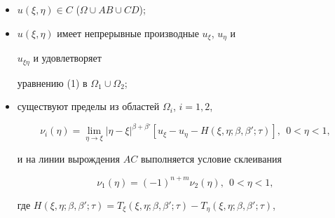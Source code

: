 \begin{itemize} 


\item[1)] $u(\xi,\eta)\in C$ ($\Omega\cup AB\cup CD$); 


\item[2)] $u(\xi,\eta)$ имеет непрерывные производные $u_\xi$, $u_\eta$ и 


$u_{\xi\eta}$ и удовлетворяет 


уравнению (1) в $\Omega_1\cup\Omega_2$; 


\item[3)] существуют пределы из областей $\Omega_i$, $i=1,2$, 


\begin{equation} 


\nu_i(\eta)=\lim_{\eta\to\xi}|\eta-\xi|^{\beta+\beta'} 


[u_\xi-u_\eta-H(\xi,\eta;\beta,\beta';\tau)],\ \ 0<\eta<1, 


\end{equation} 


и на линии вырождения $AC$ выполняется условие склеивания 


\begin{equation} 


\nu_1(\eta)=(-1)^{n+m}\nu_2(\eta),\ \ 0<\eta<1, 


\end{equation} 


где $H(\xi,\eta;\beta,\beta';\tau)= T_\xi(\xi,\eta;\beta,\beta';\tau)- 


T_\eta(\xi,\eta;\beta,\beta';\tau)$, 


\end{itemize} 


